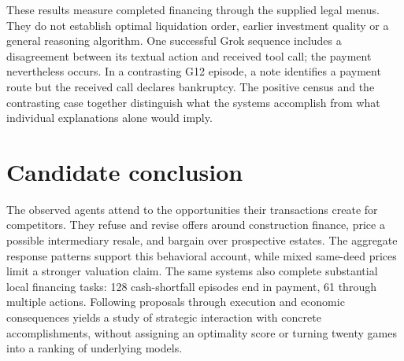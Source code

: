 These results measure completed financing through the supplied legal menus.
They do not establish optimal liquidation order, earlier investment quality
or a general reasoning algorithm. One successful Grok sequence includes a
disagreement between its textual action and received tool call; the payment
nevertheless occurs. In a contrasting G12 episode, a note identifies a
payment route but the received call declares bankruptcy. The positive census
and the contrasting case together distinguish what the systems accomplish
from what individual explanations alone would imply.

\section*{Candidate conclusion}

The observed agents attend to the opportunities their transactions create
for competitors. They refuse and revise offers around construction finance,
price a possible intermediary resale, and bargain over prospective estates.
The aggregate response patterns support this behavioral account, while
mixed same-deed prices limit a stronger valuation claim. The same systems
also complete substantial local financing tasks: 128 cash-shortfall episodes
end in payment, 61 through multiple actions. Following proposals through
execution and economic consequences yields a study of strategic interaction
with concrete accomplishments, without assigning an optimality score or
turning twenty games into a ranking of underlying models.
